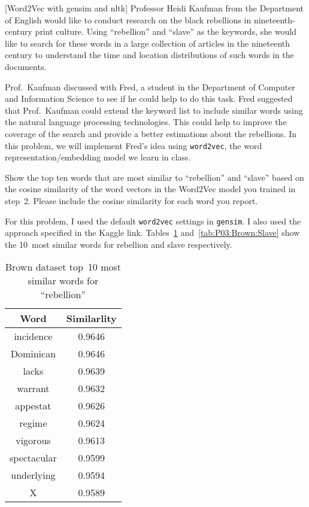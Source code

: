 \begin{problem}
  \textnormal{[Word2Vec with gensim and nltk]} Professor Heidi Kaufman from the Department of English would like to conduct research on the black rebellions in nineteenth-century print culture. Using ``rebellion'' and ``slave'' as the keywords, she would like to search for these words in a large collection of articles in the nineteenth century to understand the time and location distributions of such words in the documents.

  Prof.\ Kaufman discussed with Fred, a student in the Department of Computer and Information Science to see if he could help to do this task. Fred suggested that Prof.\ Kaufman could extend the keyword list to include similar words using the natural language processing technologies. This could help to improve the coverage of the search and provide a better estimations about the rebellions. In this problem, we will implement Fred’s idea using \texttt{word2vec}, the word representation/embedding model we learn in class.
\end{problem}

\begin{subproblem}
  Show the top ten words that are most similar to ``rebellion'' and ``slave'' based on the cosine similarity of the word vectors in the Word2Vec model you trained in step~2. Please include the cosine similarity for each word you report.
\end{subproblem}

For this problem, I used the default \texttt{word2vec} settings in \texttt{gensim}.  I also used the approach specified in the Kaggle link.  Tables~\ref{tab:P03:Brown:Rebellion} and~\ref{tab:P03:Brown:Slave} show the 10~most similar words for rebellion and slave respectively.

\begin{table}[h]
  \centering
  \caption{Brown dataset top~10 most similar words for ``rebellion''}\label{tab:P03:Brown:Rebellion}
  \begin{tabular}{|c|c|}
    \hline
    \textbf{Word} & \textbf{Similarlity} \\\hline\hline
    incidence     & 0.9646 \\\hline
    Dominican     & 0.9646 \\\hline
    lacks         & 0.9639 \\\hline
    warrant       & 0.9632 \\\hline
    appestat      & 0.9626 \\\hline
    regime        & 0.9624 \\\hline
    vigorous      & 0.9613 \\\hline
    spectacular   & 0.9599 \\\hline
    underlying    & 0.9594 \\\hline
    X             & 0.9589 \\\hline
  \end{tabular}
\end{table}

